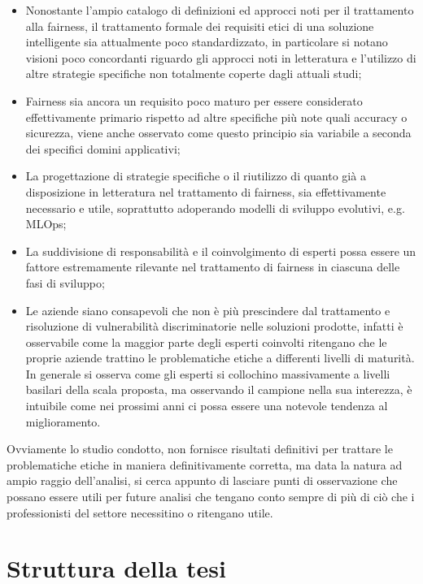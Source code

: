 \begin{itemize}
    \item Nonostante l'ampio catalogo di definizioni ed approcci noti per il trattamento alla fairness, il trattamento formale dei requisiti etici di una soluzione intelligente sia attualmente poco standardizzato, in particolare si notano visioni poco concordanti riguardo gli approcci noti in letteratura e l'utilizzo di altre strategie specifiche non totalmente coperte dagli attuali studi;
    \item Fairness sia ancora un requisito poco maturo per essere considerato effettivamente primario rispetto ad altre specifiche più note quali accuracy o sicurezza, viene anche osservato come questo principio sia variabile a seconda dei specifici domini applicativi;
    \item La progettazione di strategie specifiche o il riutilizzo di quanto già a disposizione in letteratura nel trattamento di fairness, sia effettivamente necessario e utile, soprattutto adoperando modelli di sviluppo evolutivi, e.g. MLOps;
    \item La suddivisione di responsabilità e il coinvolgimento di esperti possa essere un fattore estremamente rilevante nel trattamento di fairness in ciascuna delle fasi di sviluppo;
    \item Le aziende siano consapevoli che non è più prescindere dal trattamento e risoluzione di vulnerabilità discriminatorie nelle soluzioni prodotte, infatti è osservabile come la maggior parte degli esperti coinvolti ritengano che le proprie aziende trattino le problematiche etiche a differenti livelli di maturità. In generale si osserva come gli esperti si collochino massivamente a livelli basilari della scala proposta, ma osservando il campione nella sua interezza, è intuibile come nei prossimi anni ci possa essere una notevole tendenza al miglioramento. 
\end{itemize}
 
 Ovviamente lo studio condotto, non fornisce risultati definitivi per trattare le problematiche etiche in maniera definitivamente corretta, ma data la natura ad ampio raggio dell'analisi, si cerca appunto di lasciare punti di osservazione che possano essere utili per future analisi che tengano conto sempre di più di ciò che i professionisti del settore necessitino o ritengano utile.
\section{Struttura della tesi}

